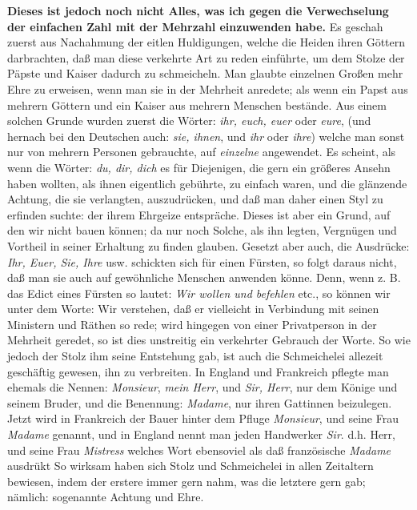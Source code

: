 \textbf{Dieses ist jedoch noch nicht Alles, was ich gegen die Verwechselung der
einfachen Zahl mit der Mehrzahl einzuwenden habe.} Es geschah zuerst aus
Nachahmung der eitlen Huldigungen, welche die Heiden
ihren Göttern darbrachten,
daß man diese verkehrte Art zu reden einführte, um dem Stolze der
Päpste und
Kaiser dadurch zu schmeicheln.
Man glaubte einzelnen Großen mehr Ehre zu
erweisen, wenn man sie in der Mehrheit anredete; als wenn ein Papst aus mehrern
Göttern und ein Kaiser aus mehrern Menschen bestände. Aus einem solchen Grunde
wurden zuerst die Wörter: \textit{ihr, euch, euer} oder \textit{eure}, (und
hernach bei
den Deutschen auch: \textit{sie, ihnen}, und \textit{ihr} oder \textit{ihre})
welche man sonst
nur von mehrern Personen gebrauchte, auf \textit{einzelne} angewendet. Es
scheint,
als wenn die Wörter: \textit{du, dir, dich} es für Diejenigen, die gern ein
größeres
Ansehn haben wollten, als ihnen eigentlich gebührte, zu einfach waren, und die
glänzende Achtung, die sie verlangten, auszudrücken, und daß man daher einen
Styl zu erfinden suchte: der ihrem Ehrgeize entspräche. Dieses ist aber ein
Grund, auf den wir nicht bauen können; da nur noch Solche, als ihn legten,
Vergnügen und Vortheil in seiner Erhaltung zu finden glauben. Gesetzt aber auch,
die Ausdrücke: \textit{Ihr, Euer, Sie, Ihre} usw. schickten sich für einen
Fürsten,
so folgt daraus nicht, daß man sie auch auf gewöhnliche Menschen anwenden könne.
Denn, wenn z. B. das Edict eines Fürsten so lautet: \textit{Wir wollen und
befehlen}
etc., so können wir unter dem Worte: Wir verstehen, daß er vielleicht in
Verbindung mit seinen Ministern und Räthen so rede; wird hingegen von einer
Privatperson in der Mehrheit geredet, so ist dies unstreitig ein verkehrter
Gebrauch der Worte. So wie jedoch der Stolz ihm seine Entstehung gab, ist auch
die Schmeichelei allezeit geschäftig gewesen, ihn zu verbreiten. In England und
Frankreich pflegte man ehemals die Nennen: \textit{Monsieur}, \textit{mein
Herr}, und
\textit{Sir, Herr}, nur dem Könige und seinem Bruder, und die Benennung:
\textit{Madame},
nur ihren Gattinnen beizulegen. Jetzt wird in Frankreich der
Bauer hinter dem
Pfluge \textit{Monsieur}, und seine Frau \textit{Madame} genannt, und in England
nennt man
jeden Handwerker \textit{Sir}. d.h. Herr, und seine
Frau \textit{Mistress} welches Wort
ebensoviel als daß französische \textit{Madame} ausdrükt So wirksam haben sich
Stolz und
Schmeichelei in allen Zeitaltern bewiesen, indem der erstere immer gern nahm,
was die letztere gern gab; nämlich: sogenannte Achtung und Ehre.


